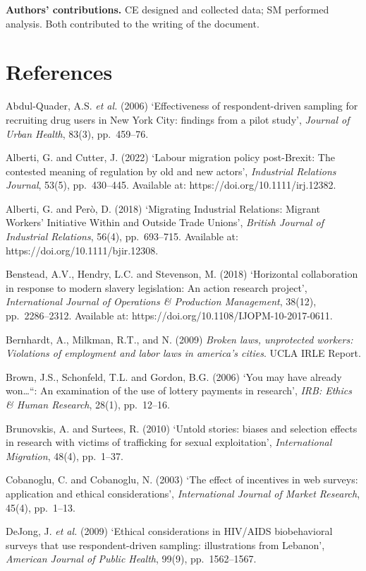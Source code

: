 \documentclass[
  12pt,
  letterpaper,
  DIV=11,
  numbers=noendperiod]{scrartcl}
\begin{document}
\textbf{Authors' contributions.} CE designed and collected data; SM
performed analysis. Both contributed to the writing of the document.

\section{References}\label{references}

Abdul-Quader, A.S. \emph{et al.} (2006) `Effectiveness of
respondent-driven sampling for recruiting drug users in New York City:
findings from a pilot study', \emph{Journal of Urban Health}, 83(3),
pp.~459--76.

Alberti, G. and Cutter, J. (2022) `Labour migration policy post-Brexit:
The contested meaning of regulation by old and new actors',
\emph{Industrial Relations Journal}, 53(5), pp.~430--445. Available at:
https://doi.org/10.1111/irj.12382.

Alberti, G. and Però, D. (2018) `Migrating Industrial Relations: Migrant
Workers' Initiative Within and Outside Trade Unions', \emph{British
Journal of Industrial Relations}, 56(4), pp.~693--715. Available at:
https://doi.org/10.1111/bjir.12308.

Benstead, A.V., Hendry, L.C. and Stevenson, M. (2018) `Horizontal
collaboration in response to modern slavery legislation: An action
research project', \emph{International Journal of Operations \&
Production Management}, 38(12), pp.~2286--2312. Available at:
https://doi.org/10.1108/IJOPM-10-2017-0611.

Bernhardt, A., Milkman, R.T., and N. (2009) \emph{Broken laws,
unprotected workers: Violations of employment and labor laws in
america's cities}. UCLA IRLE Report.

Brown, J.S., Schonfeld, T.L. and Gordon, B.G. (2006) `You may have
already won\ldots``: An examination of the use of lottery payments in
research', \emph{IRB: Ethics \& Human Research}, 28(1), pp.~12--16.

Brunovskis, A. and Surtees, R. (2010) `Untold stories: biases and
selection effects in research with victims of trafficking for sexual
exploitation', \emph{International Migration}, 48(4), pp.~1--37.

Cobanoglu, C. and Cobanoglu, N. (2003) `The effect of incentives in web
surveys: application and ethical considerations', \emph{International
Journal of Market Research}, 45(4), pp.~1--13.

DeJong, J. \emph{et al.} (2009) `Ethical considerations in HIV/AIDS
biobehavioral surveys that use respondent-driven sampling: illustrations
from Lebanon', \emph{American Journal of Public Health}, 99(9),
pp.~1562--1567.
\end{document}
